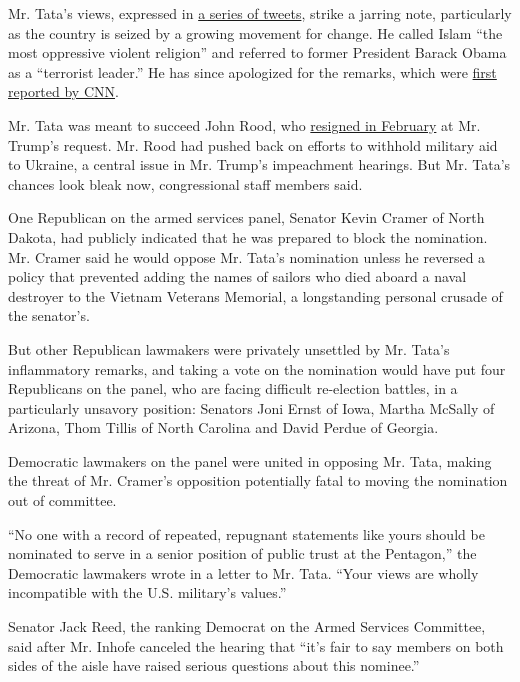 Mr. Tata's views, expressed in
\href{https://twitter.com/ajtata/status/1014278134185840640}{a series of
tweets}, strike a jarring note, particularly as the country is seized by
a growing movement for change. He called Islam ``the most oppressive
violent religion'' and referred to former President Barack Obama as a
``terrorist leader.'' He has since apologized for the remarks, which
were
\href{https://edition.cnn.com/2020/06/12/politics/pentagon-nominee-tata-trump-kfile/index.html}{first
reported by CNN}.

Mr. Tata was meant to succeed John Rood, who
\href{https://www.nytimes.com/2020/02/19/us/politics/john-rood-trump.html}{resigned
in February} at Mr. Trump's request. Mr. Rood had pushed back on efforts
to withhold military aid to Ukraine, a central issue in Mr. Trump's
impeachment hearings. But Mr. Tata's chances look bleak now,
congressional staff members said.

One Republican on the armed services panel, Senator Kevin Cramer of
North Dakota, had publicly indicated that he was prepared to block the
nomination. Mr. Cramer said he would oppose Mr. Tata's nomination unless
he reversed a policy that prevented adding the names of sailors who died
aboard a naval destroyer to the Vietnam Veterans Memorial, a
longstanding personal crusade of the senator's.

But other Republican lawmakers were privately unsettled by Mr. Tata's
inflammatory remarks, and taking a vote on the nomination would have put
four Republicans on the panel, who are facing difficult re-election
battles, in a particularly unsavory position: Senators Joni Ernst of
Iowa, Martha McSally of Arizona, Thom Tillis of North Carolina and David
Perdue of Georgia.

Democratic lawmakers on the panel were united in opposing Mr. Tata,
making the threat of Mr. Cramer's opposition potentially fatal to moving
the nomination out of committee.

``No one with a record of repeated, repugnant statements like yours
should be nominated to serve in a senior position of public trust at the
Pentagon,'' the Democratic lawmakers wrote in a letter to Mr. Tata.
``Your views are wholly incompatible with the U.S. military's values.''

Senator Jack Reed, the ranking Democrat on the Armed Services Committee,
said after Mr. Inhofe canceled the hearing that ``it's fair to say
members on both sides of the aisle have raised serious questions about
this nominee.''

